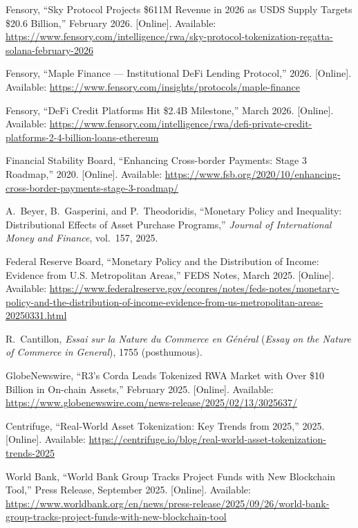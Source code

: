 \documentclass[12pt,a4paper]{report}
\begin{document}
{\begin{enumerate}[label={[\arabic*]}]
\item Fensory, ``Sky Protocol Projects \$611M Revenue in 2026 as USDS Supply Targets \$20.6 Billion,'' February 2026. [Online]. Available: \url{https://www.fensory.com/intelligence/rwa/sky-protocol-tokenization-regatta-solana-february-2026}

\item Fensory, ``Maple Finance --- Institutional DeFi Lending Protocol,'' 2026. [Online]. Available: \url{https://www.fensory.com/insights/protocols/maple-finance}

\item Fensory, ``DeFi Credit Platforms Hit \$2.4B Milestone,'' March 2026. [Online]. Available: \url{https://www.fensory.com/intelligence/rwa/defi-private-credit-platforms-2-4-billion-loans-ethereum}

\item Financial Stability Board, ``Enhancing Cross-border Payments: Stage 3 Roadmap,'' 2020. [Online]. Available: \url{https://www.fsb.org/2020/10/enhancing-cross-border-payments-stage-3-roadmap/}

\item A.~Beyer, B.~Gasperini, and P.~Theodoridis, ``Monetary Policy and Inequality: Distributional Effects of Asset Purchase Programs,'' \textit{Journal of International Money and Finance}, vol.~157, 2025.

\item Federal Reserve Board, ``Monetary Policy and the Distribution of Income: Evidence from U.S. Metropolitan Areas,'' FEDS Notes, March 2025. [Online]. Available: \url{https://www.federalreserve.gov/econres/notes/feds-notes/monetary-policy-and-the-distribution-of-income-evidence-from-us-metropolitan-areas-20250331.html}

\item R.~Cantillon, \textit{Essai sur la Nature du Commerce en G\'en\'eral} (\textit{Essay on the Nature of Commerce in General}), 1755 (posthumous).

\item GlobeNewswire, ``R3's Corda Leads Tokenized RWA Market with Over \$10 Billion in On-chain Assets,'' February 2025. [Online]. Available: \url{https://www.globenewswire.com/news-release/2025/02/13/3025637/}

\item Centrifuge, ``Real-World Asset Tokenization: Key Trends from 2025,'' 2025. [Online]. Available: \url{https://centrifuge.io/blog/real-world-asset-tokenization-trends-2025}

\item World Bank, ``World Bank Group Tracks Project Funds with New Blockchain Tool,'' Press Release, September 2025. [Online]. Available: \url{https://www.worldbank.org/en/news/press-release/2025/09/26/world-bank-group-tracks-project-funds-with-new-blockchain-tool}


\end{enumerate}}
\end{document}

